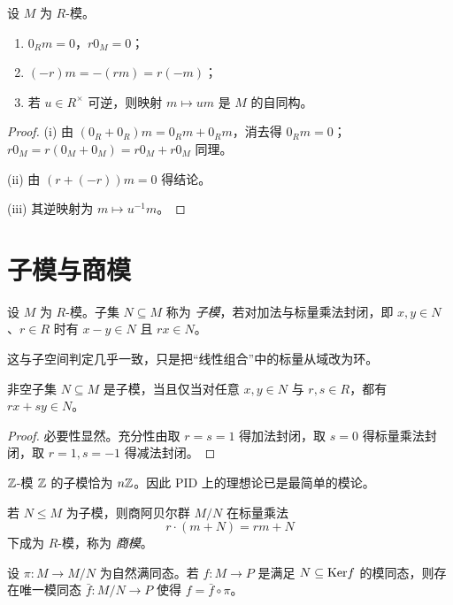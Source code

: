 \begin{proposition}
设 $M$ 为 $R$-模。
\begin{enumerate}[label=(\roman*)]
\item $0_Rm=0$，$r0_M=0$；
\item $(-r)m=-(rm)=r(-m)$；
\item 若 $u\in R^\times$ 可逆，则映射 $m\mapsto um$ 是 $M$ 的自同构。
\end{enumerate}
\end{proposition}

\begin{proof}
(i) 由 $(0_R+0_R)m=0_Rm+0_Rm$，消去得 $0_Rm=0$；$r0_M=r(0_M+0_M)=r0_M+r0_M$ 同理。

(ii) 由 $(r+(-r))m=0$ 得结论。

(iii) 其逆映射为 $m\mapsto u^{-1}m$。
\end{proof}

\section{子模与商模}

\begin{definition}
设 $M$ 为 $R$-模。子集 $N\subseteq M$ 称为 \emph{子模}，若对加法与标量乘法封闭，即 $x,y\in N$、$r\in R$ 时有 $x-y\in N$ 且 $rx\in N$。
\end{definition}

这与子空间判定几乎一致，只是把“线性组合”中的标量从域改为环。

\begin{proposition}[子模判定]
非空子集 $N\subseteq M$ 是子模，当且仅当对任意 $x,y\in N$ 与 $r,s\in R$，都有 $rx+sy\in N$。
\end{proposition}

\begin{proof}
必要性显然。充分性由取 $r=s=1$ 得加法封闭，取 $s=0$ 得标量乘法封闭，取 $r=1,s=-1$ 得减法封闭。
\end{proof}

\begin{example}
$\mathbb{Z}$-模 $\mathbb{Z}$ 的子模恰为 $n\mathbb{Z}$。因此 PID 上的理想论已是最简单的模论。
\end{example}

\begin{definition}
若 $N\le M$ 为子模，则商阿贝尔群 $M/N$ 在标量乘法
\[
 r\cdot (m+N)=rm+N
\]
下成为 $R$-模，称为 \emph{商模}。
\end{definition}

\begin{proposition}[商模的泛性质]
设 $\pi:M\to M/N$ 为自然满同态。若 $f:M\to P$ 是满足 $N\subseteq \mathrm{Ker} f$ 的模同态，则存在唯一模同态 $\bar f:M/N\to P$ 使得 $f=\bar f\circ \pi$。
\end{proposition}

